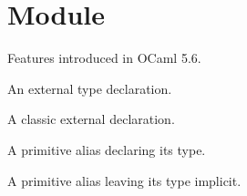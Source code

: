 \section{Module }\label{Ocaml_56}%
Features introduced in OCaml 5.6.

\label{Ocaml_56--type-ext}\begin{ocamlindent}An external type declaration.\end{ocamlindent}%
\medbreak
\label{Ocaml_56--val-classic}\begin{ocamlindent}A classic external declaration.\end{ocamlindent}%
\medbreak
\label{Ocaml_56--val-alias_with_type}\begin{ocamlindent}A primitive alias declaring its type.\end{ocamlindent}%
\medbreak
\label{Ocaml_56--val-alias_no_type}\begin{ocamlindent}A primitive alias leaving its type implicit.\end{ocamlindent}%
\medbreak



